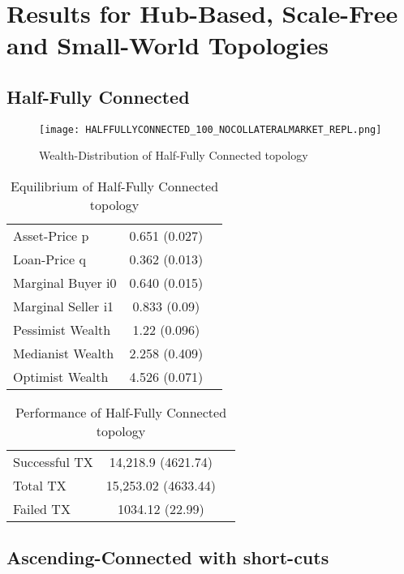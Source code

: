 \documentclass[Bachelorarbeit.tex]{subfiles}
\begin{document}
\graphicspath{{./figures/appendixResults/}}	%

\chapter{Results for Hub-Based, Scale-Free and Small-World Topologies}
\label{app:results}

\section{Half-Fully Connected}
\begin{figure}[H]
	\centering
  \texttt{[image: HALFFULLYCONNECTED\_100\_NOCOLLATERALMARKET\_REPL.png]}
	\caption{Wealth-Distribution of Half-Fully Connected topology }
	\label{fig:wealth_HALFFULLYCONNECTED_100_NOCOLLATERALMARKET_REPL}
\end{figure}

\begin{table}[H]
	\caption{Equilibrium of Half-Fully Connected topology}
	\centering
	\begin{tabular} { l c r }
		\hline
		Asset-Price p & 0.651 (0.027) \\
		Loan-Price q & 0.362 (0.013) \\
		Marginal Buyer i0 & 0.640 (0.015) \\
		Marginal Seller i1 & 0.833 (0.09) \\
		\hline
		Pessimist Wealth & 1.22 (0.096) \\
		Medianist Wealth & 2.258 (0.409) \\
		Optimist Wealth & 4.526 (0.071) \\
		\hline
	\end{tabular}
\end{table} 

\begin{table}[H]
	\caption{Performance of Half-Fully Connected topology}
	\centering
	\begin{tabular} { l c r }
		\hline
		Successful TX & 14,218.9 (4621.74) \\
		Total TX & 15,253.02 (4633.44) \\
		Failed TX & 1034.12 (22.99) \\
		\hline
	\end{tabular}
\end{table}

\section{Ascending-Connected with short-cuts}
\end{document}
